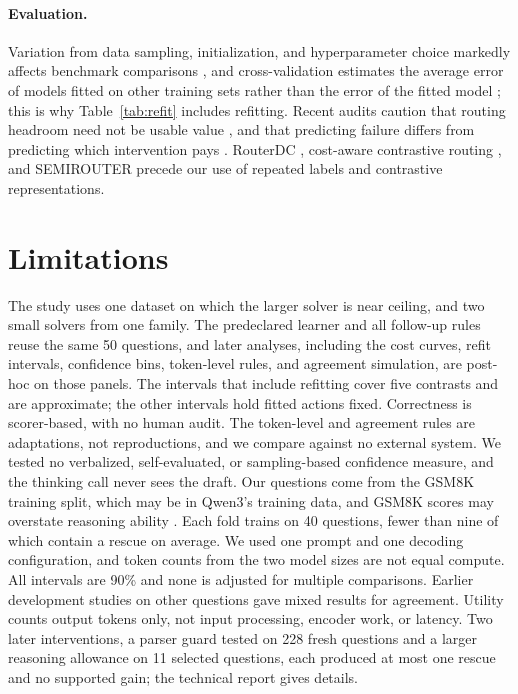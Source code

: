 \documentclass[10pt,letterpaper]{article}
\begin{document}
\paragraph{Evaluation.} Variation from data sampling, initialization, and hyperparameter choice markedly affects benchmark comparisons \citep{bouthillier2021variance}, and cross-validation estimates the average error of models fitted on other training sets rather than the error of the fitted model \citep{bates2024crossvalidation}; this is why Table~\ref{tab:refit} includes refitting. Recent audits caution that routing headroom need not be usable value \citep{chen2026routingoracle,garg2026unsolvability}, and that predicting failure differs from predicting which intervention pays \citep{yang2026failureprotocol}. RouterDC \citep{chen2024routerdc}, cost-aware contrastive routing \citep{shirkavand2025cscr}, and SEMIROUTER \citep{wang2026semirouter} precede our use of repeated labels and contrastive representations.

\section{Limitations}

The study uses one dataset on which the larger solver is near ceiling, and two small solvers from one family. The predeclared learner and all follow-up rules reuse the same 50 questions, and later analyses, including the cost curves, refit intervals, confidence bins, token-level rules, and agreement simulation, are post-hoc on those panels. The intervals that include refitting cover five contrasts and are approximate; the other intervals hold fitted actions fixed. Correctness is scorer-based, with no human audit. The token-level and agreement rules are adaptations, not reproductions, and we compare against no external system. We tested no verbalized, self-evaluated, or sampling-based confidence measure, and the thinking call never sees the draft. Our questions come from the GSM8K training split, which may be in Qwen3's training data, and GSM8K scores may overstate reasoning ability \citep{mirzadeh2025gsmsymbolic}. Each fold trains on 40 questions, fewer than nine of which contain a rescue on average. We used one prompt and one decoding configuration, and token counts from the two model sizes are not equal compute. All intervals are 90\% and none is adjusted for multiple comparisons. Earlier development studies on other questions gave mixed results for agreement. Utility counts output tokens only, not input processing, encoder work, or latency. Two later interventions, a parser guard tested on 228 fresh questions and a larger reasoning allowance on 11 selected questions, each produced at most one rescue and no supported gain; the technical report gives details.
\end{document}
